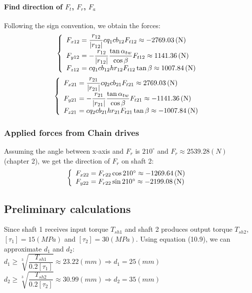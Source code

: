 \paragraph{Find direction of $ F_{t} $, $ F_r $, $ F_a $}
Following the sign convention, we obtain the forces:
\[
\left\{ 
\begin{array}{l@{{}={}}l}
F_{x12}& \dfrac{r_{12}}{|r_{12}|}cq_1cb_{12}F_{t12}\approx-2769.03\unit{(N)}\\

F_{y12}& -\dfrac{r_{12}}{|r_{12}|}\dfrac{\tan\alpha_{tw}}{\cos\beta}F_{t12}\approx1141.36\unit{(N)}\\

F_{z12}& cq_1cb_{12}hr_{12}F_{t12}\tan\beta\approx1007.84\unit{(N)}\\ 
\end{array}
\right.
\]
\[
\left\{ 
\begin{array}{l@{{}={}}l}
F_{x21}& \dfrac{r_{21}}{|r_{21}|}cq_2cb_{21}F_{t21}\approx2769.03\unit{(N)}\\

F_{y21}& -\dfrac{r_{21}}{|r_{21}|}\dfrac{\tan\alpha_{tw}}{\cos\beta}F_{t21}\approx-1141.36\unit{(N)}\\

F_{z21}& cq_2cb_{21}hr_{21}F_{t21}\tan\beta\approx-1007.84\unit{(N)}\\ 
\end{array}
\right.
\]

\subsubsection{Applied forces from Chain drives}
Assuming the angle between x-axis and $ F_r $ is $ 210^\circ $ and $ F_r \approx 2539.28\unit{(N)} $ (chapter 2), we get the direction of $ F_r $ on shaft 2:
\[
\left\{ 
\begin{array}{l@{{}={}}l}
F_{x22}& F_{r22}\cos210^\circ\approx-1269.64\unit{(N)}\\

F_{y22}& F_{r22}\sin210^\circ\approx-2199.08\unit{(N)}\\
\end{array}
\right.
\]

\subsection{Preliminary calculations}
Since shaft 1 receives input torque $ T_{sh1} $ and shaft 2 produces output torque $ T_{sh2} $, $ [\tau_1] = 15\unit{(MPa)}$ and $ [\tau_2]=30\unit{(MPa)} $. Using equation (10.9), we can approximate $ d_1 $ and $ d_2 $:\\
$ d_1 \geq \sqrt[3]{\dfrac{T_{sh1}}{0.2[\tau_1]}} \approx 23.22\unit{(mm)}\Rightarrow d_1 = 25\unit{(mm)}$\\
$ d_2 \geq \sqrt[3]{\dfrac{T_{sh2}}{0.2[\tau_2]}} \approx 30.99\unit{(mm)}\Rightarrow d_2 = 35\unit{(mm)}$

